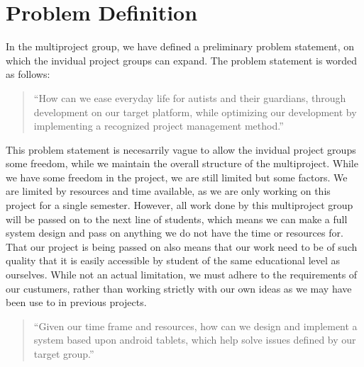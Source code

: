 \section{Problem Definition}
In the multiproject group, we have defined a preliminary problem statement, on which the invidual project groups can expand.
The problem statement is worded as follows: 
\begin{quotation}
 ``How can we ease everyday life for autists and their guardians, through development on our target platform,
 while optimizing our development by implementing a recognized project management method.''
\end{quotation}

This problem statement is necesarrily vague to allow the invidual project groups some freedom, while we maintain the overall structure of the multiproject.
While we have some freedom in the project, we are still limited but some factors.
We are limited by resources and time available, as we are only working on this project for a single semester. However, all work done by this multiproject group
will be passed on to the next line of students, which means we can make a full system design and pass on anything we do not have the time or resources for.
That our project is being passed on also means that our work need to be of such quality that it is easily accessible by student of the same educational level as ourselves.
While not an actual limitation, we must adhere to the requirements of our custumers, rather than working strictly with our own ideas as we may have been use to in previous projects.

\begin{quotation}
 ``Given our time frame and resources, how can we design and implement a system based upon android tablets, which help solve issues defined by our target group.''
\end{quotation}




  




